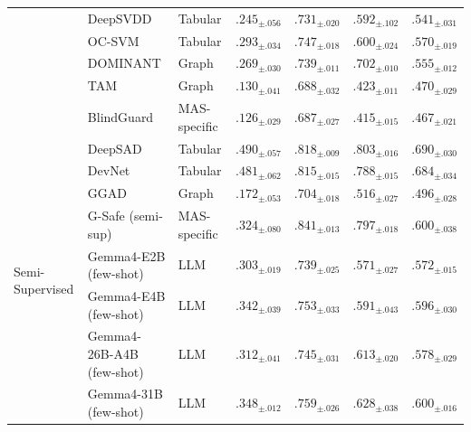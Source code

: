 \begin{table}[ht]
{\begin{tabular}{lllcccc}
& DeepSVDD & Tabular & \cellcolor{blue!25} $.245_{ \pm .056 }$ & \cellcolor{blue!25} $.731_{ \pm .020 }$ & \cellcolor{blue!25} $.592_{ \pm .102 }$ & \cellcolor{blue!25} $.541_{ \pm .031 }$  \\
& OC-SVM & Tabular & \cellcolor{blue!50} $.293_{ \pm .034 }$ & \cellcolor{blue!50} $.747_{ \pm .018 }$ & \cellcolor{blue!50} $.600_{ \pm .024 }$ & \cellcolor{blue!50} $.570_{ \pm .019 }$  \\
& DOMINANT & Graph & \cellcolor{blue!50} $.269_{ \pm .030 }$ & \cellcolor{blue!25} $.739_{ \pm .011 }$ & \cellcolor{blue!50} $.702_{ \pm .010 }$ & \cellcolor{blue!50} $.555_{ \pm .012 }$  \\
& TAM & Graph & $.130_{ \pm .041 }$ & $.688_{ \pm .032 }$ & $.423_{ \pm .011 }$ & $.470_{ \pm .029 }$  \\
& BlindGuard & MAS-specific & $.126_{ \pm .029 }$ & $.687_{ \pm .027 }$ & $.415_{ \pm .015 }$ & $.467_{ \pm .021 }$  \\
\midrule
\multirow{8}{*}{Semi-Supervised} 
& DeepSAD & Tabular & \cellcolor{blue!50} $.490_{ \pm .057 }$ & \cellcolor{blue!50} $.818_{ \pm .009 }$ & \cellcolor{blue!50} $.803_{ \pm .016 }$ & \cellcolor{blue!50} $.690_{ \pm .030 }$  \\
& DevNet & Tabular & \cellcolor{blue!50} $.481_{ \pm .062 }$ & \cellcolor{blue!50} $.815_{ \pm .015 }$ & \cellcolor{blue!50} $.788_{ \pm .015 }$ & \cellcolor{blue!50} $.684_{ \pm .034 }$  \\
& GGAD & Graph & $.172_{ \pm .053 }$ & $.704_{ \pm .018 }$ & $.516_{ \pm .027 }$ & $.496_{ \pm .028 }$  \\
& G-Safe (semi-sup) & MAS-specific & \cellcolor{blue!50} $.324_{ \pm .080 }$ & \cellcolor{blue!50} $.841_{ \pm .013 }$ & \cellcolor{blue!50} $.797_{ \pm .018 }$ & \cellcolor{blue!50} $.600_{ \pm .038 }$  \\
& Gemma4-E2B (few-shot) & LLM & \cellcolor{blue!50} $.303_{ \pm .019 }$ & $.739_{ \pm .025 }$ & \cellcolor{blue!25} $.571_{ \pm .027 }$ & \cellcolor{blue!50} $.572_{ \pm .015 }$  \\
& Gemma4-E4B (few-shot) & LLM & \cellcolor{blue!50} $.342_{ \pm .039 }$ & $.753_{ \pm .033 }$ & \cellcolor{blue!25} $.591_{ \pm .043 }$ & \cellcolor{blue!25} $.596_{ \pm .030 }$  \\
& Gemma4-26B-A4B (few-shot) & LLM & \cellcolor{blue!50} $.312_{ \pm .041 }$ & $.745_{ \pm .031 }$ & \cellcolor{blue!50} $.613_{ \pm .020 }$ & \cellcolor{blue!25} $.578_{ \pm .029 }$  \\
& Gemma4-31B (few-shot) & LLM & \cellcolor{blue!50} $.348_{ \pm .012 }$ & \cellcolor{blue!25} $.759_{ \pm .026 }$ & \cellcolor{blue!25} $.628_{ \pm .038 }$ & \cellcolor{blue!50} $.600_{ \pm .016 }$  \\

\end{tabular}}
\end{table}
